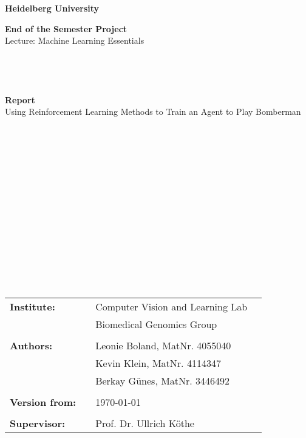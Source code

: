 \thispagestyle{empty}

\begin{verbatim}
	
	
	
\end{verbatim}

\begin{center}
	\Large{\textbf{Heidelberg University}}
\end{center}


\begin{center}
	\Large{\textbf{End of the Semester Project}}\\
	\Large{Lecture: Machine Learning Essentials}
\end{center}

\begin{verbatim}
	
	
	
\end{verbatim}

\begin{center}
	\large{\textbf{Report}}\\
	\huge{Using Reinforcement Learning Methods to Train an Agent to Play Bomberman}	
\end{center}

\begin{verbatim}
	
	
	
	
	
	
	
	
	
	
	
	
	
	
	
	
\end{verbatim}

\begin{flushleft}
	\begin{tabular}{llll}
		\textbf{Institute:} && Computer Vision and Learning Lab & \\
		&& Biomedical Genomics Group& \\
		&& \\
		\textbf{Authors:} & & Leonie Boland, MatNr. 4055040& \\
		& & Kevin Klein, MatNr. 4114347& \\
		& & Berkay Günes, MatNr. 3446492& \\
		& &\\
		\textbf{Version from:} & & \today &\\
		& & \\
		\textbf{Supervisor:} & & Prof. Dr. Ullrich Köthe &\\
	\end{tabular}
\end{flushleft}